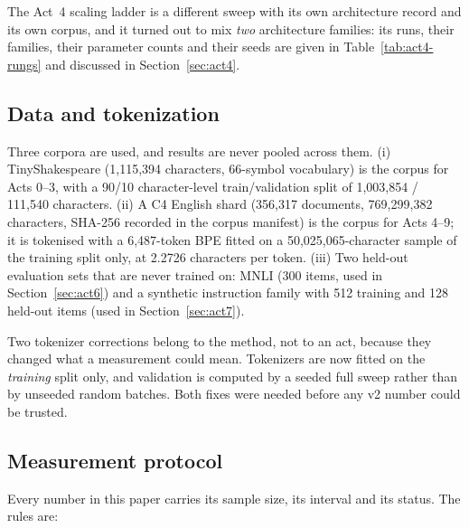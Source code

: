 \documentclass[11pt,a4paper]{article}
\begin{document}
The Act~4 scaling ladder is a different sweep with its own architecture record
and its own corpus, and it turned out to mix \emph{two} architecture families:
its runs, their families, their parameter counts and their seeds are given in
Table~\ref{tab:act4-rungs} and discussed in Section~\ref{sec:act4}.

\subsection{Data and tokenization}
\label{sec:method-data}

Three corpora are used, and results are never pooled across them. (i) TinyShakespeare
(1,115,394 characters, 66-symbol vocabulary) is the corpus for Acts 0--3, with
a 90/10 character-level train/validation split of 1,003,854 / 111,540
characters. (ii) A C4 English shard (356,317 documents, 769,299,382 characters,
SHA-256 recorded in the corpus manifest) is the corpus for Acts 4--9; it is
tokenised with a 6,487-token BPE fitted on a 50,025,065-character sample of the
training split only, at 2.2726 characters per token. (iii) Two held-out
evaluation sets that are never trained on: MNLI (300 items, used in
Section~\ref{sec:act6}) and a synthetic instruction family with 512 training
and 128 held-out items (used in Section~\ref{sec:act7}).

Two tokenizer corrections belong to the method, not to an act, because they
changed what a measurement could mean. Tokenizers are now fitted on the
\emph{training} split only, and validation is computed by a seeded full sweep
rather than by unseeded random batches. Both fixes were needed before any
v2 number could be trusted.

\subsection{Measurement protocol}
\label{sec:method-protocol}

Every number in this paper carries its sample size, its interval and its status.
The rules are:
\end{document}
